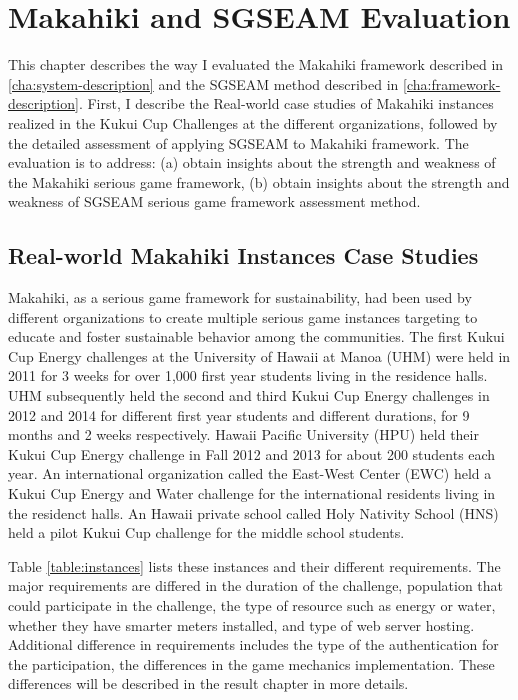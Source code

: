 \chapter{Makahiki and SGSEAM Evaluation}
\label{cha:evaluation}

This chapter describes the way I evaluated the Makahiki framework described in \autoref{cha:system-description} and the SGSEAM method described in \autoref{cha:framework-description}. First, I describe the Real-world case studies of Makahiki instances realized in the Kukui Cup Challenges at the different organizations, followed by the detailed assessment of applying SGSEAM to Makahiki framework. The evaluation is to address:
(a) obtain insights about the strength and weakness of the Makahiki serious game framework, (b) obtain insights about the strength and weakness of SGSEAM serious game framework assessment method.

\section{Real-world Makahiki Instances Case Studies}

Makahiki, as a serious game framework for sustainability, had been used by different organizations to create multiple serious game instances targeting to educate and foster sustainable behavior among the communities. The first Kukui Cup Energy challenges at the University of Hawaii at Manoa (UHM) were held in 2011 for 3 weeks for over 1,000 first year students living in the residence halls. UHM subsequently held the second and third Kukui Cup Energy challenges in 2012 and 2014 for different first year students and different durations, for 9 months and 2 weeks respectively. Hawaii Pacific University (HPU) held their Kukui Cup Energy challenge in Fall 2012 and 2013 for about 200 students each year. An international organization called the East-West Center (EWC) held a Kukui Cup Energy and Water challenge for the international residents living in the residenct halls. An Hawaii private school called Holy Nativity School (HNS) held a pilot Kukui Cup challenge for the middle school students. 

Table \autoref{table:instances} lists these instances and their different requirements. The major requirements are differed in the duration of the challenge, population that could participate in the challenge, the type of resource such as energy or water, whether they have smarter meters installed, and type of web server hosting. Additional difference in requirements includes the type of the authentication for the participation, the differences in the game mechanics implementation. These differences will be described in the result chapter in more details.

